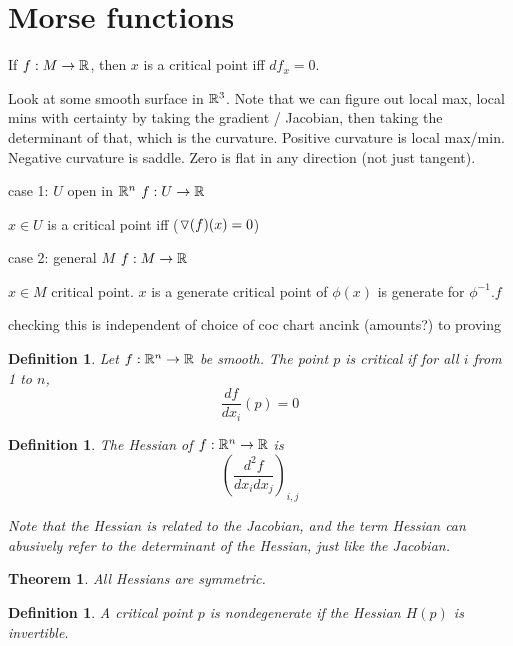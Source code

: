 \documentclass[11pt]{amsbook}
\newenvironment{dateenv}{
	\vspace{1em}
}{
	\vspace{1em}
}
\newcommand{\mydate}[4]{
	\newdate{#1}{#2}{#3}{#4}
	\begin{dateenv}
		\hfill\displaydate{#1}
	\end{dateenv}
}
\theoremstyle{mystyle} \newtheorem{thrm}[thm]{Theorem}
\theoremstyle{mystyle} \newtheorem{defi}[thm]{Definition}
\theoremstyle{mystyle} \newtheorem{coro}[thm]{Corollary}
\theoremstyle{mystyle} \newtheorem{propo}[thm]{Proposition}
\theoremstyle{mystyle} \newtheorem{lemm}[thm]{Lemma}
\numberwithin{thm}{section}
\newcommand{\de}{\emph}
\begin{document}
\section{Morse functions}

\begin{rmk}
	If $f : M \to {\mathbb R}$, then $x$ is a critical point iff $df_x = 0$.
\end{rmk}

\begin{example}
	Look at some smooth surface in ${\mathbb R}^3$.
	Note that we can figure out local max, local mins with certainty by taking the gradient / Jacobian, then taking the determinant of that, which is the curvature.  Positive curvature is local max/min.  Negative curvature is saddle.  Zero is flat in any direction (not just tangent).

		case 1:
			$U$ open in ${\mathbb R}^n$
			$f: U \to {\mathbb R}$

			$x \in U$ is a critical point iff ($\triangledown(f)(x) = 0$)

		case 2:
			general $M$
			$f: M \to {\mathbb R}$

			$x \in M$ critical point.  $x$ is a generate critical point of $\phi(x)$ is generate for $\phi^{-1}.f$


		checking this is independent of choice of coc chart ancink (amounts?) to proving
\end{example}

\mydate{d19}{30}{11}{2016}

\begin{defi}
	Let $f : {\mathbb R}^n \to {\mathbb R}$ be smooth.  The point $p$ is \emph{critical} if for all $i$ from 1 to $n$, $$\frac{df}{dx_i}(p) = 0$$
\end{defi}

\begin{defi}
	The \de{Hessian} of $f: {\mathbb R}^n \to {\mathbb R}$ is $$\left( \frac{d^2f}{dx_i dx_j} \right)_{i,j}$$

	Note that the Hessian is related to the Jacobian, and the term Hessian can abusively refer to the determinant of the Hessian, just like the Jacobian.
\end{defi}
\begin{thrm}
	All Hessians are symmetric.
\end{thrm}

\begin{defi}
	A critical point $p$ is \emph{nondegenerate} if the Hessian $H(p)$ is invertible.
\end{defi}
\end{document}
